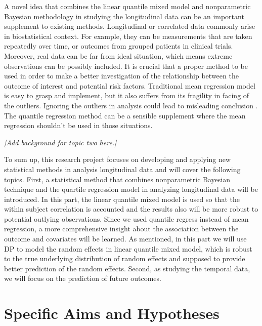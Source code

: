 \documentclass[12pt]{article}
\begin{document}
A novel idea that combines the linear quantile mixed model and nonparametric Bayesian methodology in studying the longitudinal data can be an important supplement to existing methods. Longitudinal or correlated data commonly arise in biostatistical context. For example, they can be measurements that are taken repeatedly over time, or outcomes from grouped patients in clinical trials. Moreover, real data can be far from ideal situation, which means extreme observations can be possibly included. It is crucial that a proper method to be used in order to make a better investigation of the relationship between the outcome of interest and potential risk factors. Traditional mean regression model is easy to grasp and implement, but it also suffers from its fragility in facing of the outliers. Ignoring the outliers in analysis could lead to misleading conclusion \cite{koenker2001quantile}. The quantile regression method can be a sensible supplement where the mean regression shouldn't be used in those situations. \par

\emph{[Add background for topic two here.]}\par

To sum up, this research project focuses on developing and applying new statistical methods in analysis longitudinal data and will cover the following topics. First, a statistical method that combines nonparametric Bayesian technique and the quartile regression model in analyzing longitudinal data will be introduced. In this part, the linear quantile mixed model is used so that the within subject correlation is accounted and the results also will be more robust to potential outlying observations. Since we used quantile regress instead of mean regression, a more comprehensive insight about the association between the outcome and covariates will be learned. As mentioned, in this part we will use DP to model the random effects in linear quantile mixed model, which is robust to the true underlying distribution of random effects and supposed to provide better prediction of the random effects. Second, as studying the temporal data, we will focus on the prediction of future outcomes. \par



\section{Specific Aims and Hypotheses}%
\end{document}
